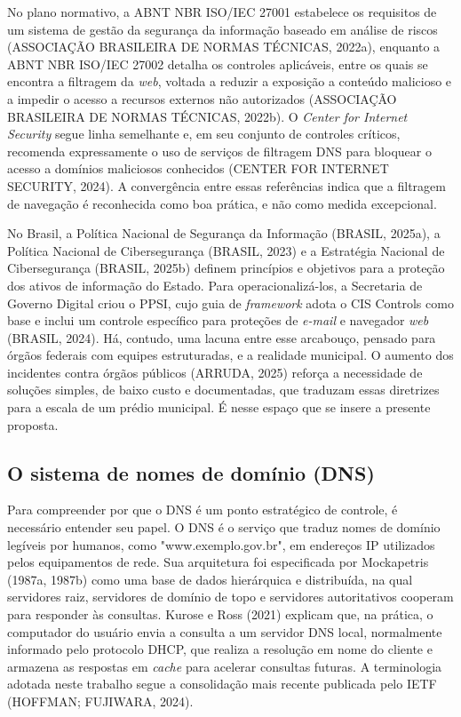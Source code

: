 \documentclass[12pt,a4paper]{article}
\begin{document}
No plano normativo, a ABNT NBR ISO/IEC 27001 estabelece os requisitos de um sistema de gestão da segurança da informação baseado em análise de riscos (ASSOCIAÇÃO BRASILEIRA DE NORMAS TÉCNICAS, 2022a), enquanto a ABNT NBR ISO/IEC 27002 detalha os controles aplicáveis, entre os quais se encontra a filtragem da \textit{web}, voltada a reduzir a exposição a conteúdo malicioso e a impedir o acesso a recursos externos não autorizados (ASSOCIAÇÃO BRASILEIRA DE NORMAS TÉCNICAS, 2022b). O \textit{Center for Internet Security} segue linha semelhante e, em seu conjunto de controles críticos, recomenda expressamente o uso de serviços de filtragem DNS para bloquear o acesso a domínios maliciosos conhecidos (CENTER FOR INTERNET SECURITY, 2024). A convergência entre essas referências indica que a filtragem de navegação é reconhecida como boa prática, e não como medida excepcional.

No Brasil, a Política Nacional de Segurança da Informação (BRASIL, 2025a), a Política Nacional de Cibersegurança (BRASIL, 2023) e a Estratégia Nacional de Cibersegurança (BRASIL, 2025b) definem princípios e objetivos para a proteção dos ativos de informação do Estado. Para operacionalizá-los, a Secretaria de Governo Digital criou o PPSI, cujo guia de \textit{framework} adota o CIS Controls como base e inclui um controle específico para proteções de \textit{e-mail} e navegador \textit{web} (BRASIL, 2024). Há, contudo, uma lacuna entre esse arcabouço, pensado para órgãos federais com equipes estruturadas, e a realidade municipal. O aumento dos incidentes contra órgãos públicos (ARRUDA, 2025) reforça a necessidade de soluções simples, de baixo custo e documentadas, que traduzam essas diretrizes para a escala de um prédio municipal. É nesse espaço que se insere a presente proposta.

\subsection{O sistema de nomes de domínio (DNS)}
Para compreender por que o DNS é um ponto estratégico de controle, é necessário entender seu papel. O DNS é o serviço que traduz nomes de domínio legíveis por humanos, como "www.exemplo.gov.br", em endereços IP utilizados pelos equipamentos de rede. Sua arquitetura foi especificada por Mockapetris (1987a, 1987b) como uma base de dados hierárquica e distribuída, na qual servidores raiz, servidores de domínio de topo e servidores autoritativos cooperam para responder às consultas. Kurose e Ross (2021) explicam que, na prática, o computador do usuário envia a consulta a um servidor DNS local, normalmente informado pelo protocolo DHCP, que realiza a resolução em nome do cliente e armazena as respostas em \textit{cache} para acelerar consultas futuras. A terminologia adotada neste trabalho segue a consolidação mais recente publicada pelo IETF (HOFFMAN; FUJIWARA, 2024).
\end{document}
